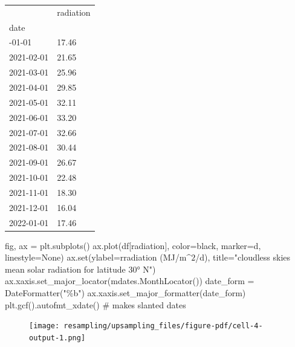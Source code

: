 \documentclass[
  letterpaper,
  DIV=11,
  numbers=noendperiod,
  oneside]{scrreprt}
\newenvironment{Shaded}{\begin{snugshade}}{\end{snugshade}}
\newcommand{\BuiltInTok}[1]{\textcolor[rgb]{0.00,0.23,0.31}{#1}}
\newcommand{\CommentTok}[1]{\textcolor[rgb]{0.37,0.37,0.37}{#1}}
\newcommand{\NormalTok}[1]{\textcolor[rgb]{0.00,0.23,0.31}{#1}}
\newcommand{\OperatorTok}[1]{\textcolor[rgb]{0.37,0.37,0.37}{#1}}
\newcommand{\StringTok}[1]{\textcolor[rgb]{0.13,0.47,0.30}{#1}}
\newcommand{\VerbatimStringTok}[1]{\textcolor[rgb]{0.13,0.47,0.30}{#1}}
\begin{document}
\begin{longtable}[]{@{}ll@{}}
\toprule\noalign{}
& radiation \\
date & \\
\midrule\noalign{}
\endhead
\bottomrule\noalign{}
\endlastfoot
2021-01-01 & 17.46 \\
2021-02-01 & 21.65 \\
2021-03-01 & 25.96 \\
2021-04-01 & 29.85 \\
2021-05-01 & 32.11 \\
2021-06-01 & 33.20 \\
2021-07-01 & 32.66 \\
2021-08-01 & 30.44 \\
2021-09-01 & 26.67 \\
2021-10-01 & 22.48 \\
2021-11-01 & 18.30 \\
2021-12-01 & 16.04 \\
2022-01-01 & 17.46 \\
\end{longtable}

\begin{Shaded}
\begin{Highlighting}[]
\NormalTok{fig, ax }\OperatorTok{=}\NormalTok{ plt.subplots()}
\NormalTok{ax.plot(df[}\StringTok{\textquotesingle{}radiation\textquotesingle{}}\NormalTok{], color}\OperatorTok{=}\StringTok{\textquotesingle{}black\textquotesingle{}}\NormalTok{, marker}\OperatorTok{=}\StringTok{\textquotesingle{}d\textquotesingle{}}\NormalTok{, linestyle}\OperatorTok{=}\StringTok{\textquotesingle{}None\textquotesingle{}}\NormalTok{)}
\NormalTok{ax.}\BuiltInTok{set}\NormalTok{(ylabel}\OperatorTok{=}\VerbatimStringTok{r\textquotesingle{}radiation (MJ/m$\^{}2$/d)\textquotesingle{}}\NormalTok{,}
\NormalTok{       title}\OperatorTok{=}\StringTok{"cloudless skies mean solar radiation for latitude 30° N"}\NormalTok{)}
\NormalTok{ax.xaxis.set\_major\_locator(mdates.MonthLocator())}
\NormalTok{date\_form }\OperatorTok{=}\NormalTok{ DateFormatter(}\StringTok{"\%b"}\NormalTok{)}
\NormalTok{ax.xaxis.set\_major\_formatter(date\_form)}
\NormalTok{plt.gcf().autofmt\_xdate()  }\CommentTok{\# makes slanted dates}
\end{Highlighting}
\end{Shaded}

\begin{figure}[H]

{\centering \texttt{[image: resampling/upsampling\_files/figure-pdf/cell-4-output-1.png]}

}

\end{figure}
\end{document}

